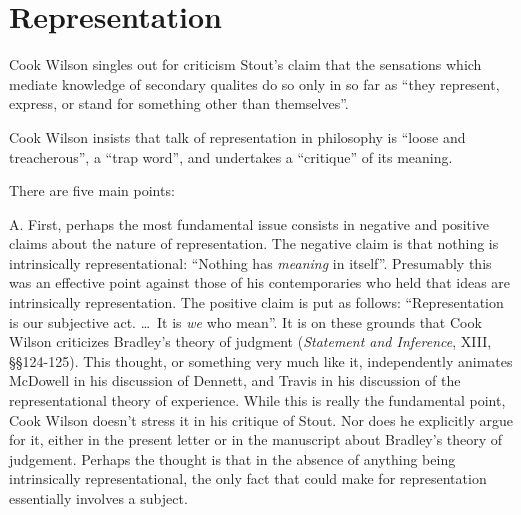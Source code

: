 \documentclass[11pt]{article}
\begin{document}

\section{Representation} %
\label{sec:representation}

Cook Wilson singles out for criticism Stout's claim that the sensations which mediate knowledge of secondary qualites do so only in so far as ``they represent, express, or stand for something other than themselves''.

Cook Wilson insists that talk of representation in philosophy is ``loose and treacherous'', a ``trap word'', and undertakes a ``critique'' of its meaning.

There are five main points:

A. First, perhaps the most fundamental issue consists in negative and positive claims about the nature of representation. The negative claim is that nothing is intrinsically representational: ``Nothing has \emph{meaning} in itself''. Presumably this was an effective point against those of his contemporaries who held that ideas are intrinsically representation. The positive claim is put as follows: ``Representation is our subjective act. \ldots\ It is \emph{we} who mean''. It is on these grounds that Cook Wilson criticizes Bradley's theory of judgment (\emph{Statement and Inference}, XIII, §§124-125). This thought, or something very much like it, independently animates McDowell in his discussion of Dennett, and Travis in his discussion of the representational theory of experience. While this is really the fundamental point, Cook Wilson doesn't stress it in his critique of Stout. Nor does he explicitly argue for it, either in the present letter or in the manuscript about Bradley's theory of judgement. Perhaps the thought is that in the absence of anything being intrinsically representational, the only fact that could make for representation essentially involves a subject.
\end{document}
